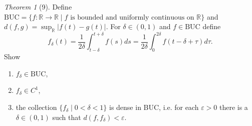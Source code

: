 \documentclass[12pt]{article}
\theoremstyle{remark}
\theoremstyle{named}
\newtheorem*{theorem}{Theorem}
\renewcommand{\d}{\delta}
\newcommand{\e}{\varepsilon}
\newcommand{\R}{\mathbb R}
\newcommand{\abs}[1]{|#1|}
\begin{document}
\begin{theorem}[9]
    Define \(\text{BUC} = \{f : \R \to \R \mid f \text{ is bounded and uniformly continuous on } \R\}\) and \(d(f, g) = \sup_\R \abs{f(t) - g(t)}\). For \(\d \in (0, 1)\) and \(f \in \text{BUC}\) define 
    \[f_\d(t) = \frac{1}{2\d}\int_{t - \d}^{t + \d} f(s)ds = \frac{1}{2\d}\int_{0}^{2\d} f(t - \d + \tau)d\tau.\]
    Show
    \begin{enumerate}
        \item \(f_\d \in \text{BUC}\),
        \item \(f_\d \in C^1\),
        \item the collection \(\{f_\d \mid 0 < \d < 1\}\) is dense in BUC, i.e. for each \(\e > 0\) there is a \(\d \in (0, 1)\) such that \(d(f, f_\d) < \e\).
    \end{enumerate}
\end{theorem}
\end{document}
